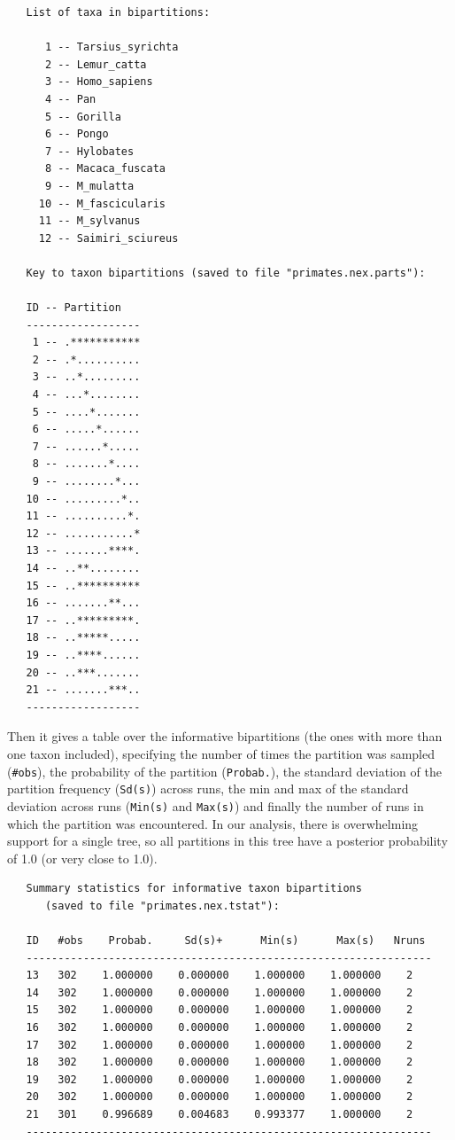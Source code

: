 \documentclass[12pt]{book}
\begin{document}
\begin{singlespacing}
\small
\begin{verbatim}
   List of taxa in bipartitions:                                                 
                                                                                   
      1 -- Tarsius_syrichta
      2 -- Lemur_catta
      3 -- Homo_sapiens
      4 -- Pan
      5 -- Gorilla
      6 -- Pongo
      7 -- Hylobates
      8 -- Macaca_fuscata
      9 -- M_mulatta
     10 -- M_fascicularis
     11 -- M_sylvanus
     12 -- Saimiri_sciureus

   Key to taxon bipartitions (saved to file "primates.nex.parts"):

   ID -- Partition
   ------------------
    1 -- .***********
    2 -- .*..........
    3 -- ..*.........
    4 -- ...*........
    5 -- ....*.......
    6 -- .....*......
    7 -- ......*.....
    8 -- .......*....
    9 -- ........*...
   10 -- .........*..
   11 -- ..........*.
   12 -- ...........*
   13 -- .......****.
   14 -- ..**........
   15 -- ..**********
   16 -- .......**...
   17 -- ..*********.
   18 -- ..*****.....
   19 -- ..****......
   20 -- ..***.......
   21 -- .......***..
   ------------------
\end{verbatim}
\normalsize
\end{singlespacing}

Then it gives a table over the informative bipartitions (the ones with more than one taxon
included), specifying the number of times the partition was sampled (\texttt{\#obs}), the
probability of the partition (\texttt{Probab.}), the standard deviation of the partition frequency
(\texttt{Sd(s)}) across runs, the min and max of the standard deviation across runs
(\texttt{Min(s)} and \texttt{Max(s)}) and finally the number of runs in which the partition was
encountered. In our analysis, there is overwhelming support for a single tree, so all partitions in
this tree have a posterior probability of 1.0 (or very close to 1.0).

\begin{singlespacing}
\small
\begin{verbatim}
   Summary statistics for informative taxon bipartitions
      (saved to file "primates.nex.tstat"):

   ID   #obs    Probab.     Sd(s)+      Min(s)      Max(s)   Nruns 
   ----------------------------------------------------------------
   13   302    1.000000    0.000000    1.000000    1.000000    2
   14   302    1.000000    0.000000    1.000000    1.000000    2
   15   302    1.000000    0.000000    1.000000    1.000000    2
   16   302    1.000000    0.000000    1.000000    1.000000    2
   17   302    1.000000    0.000000    1.000000    1.000000    2
   18   302    1.000000    0.000000    1.000000    1.000000    2
   19   302    1.000000    0.000000    1.000000    1.000000    2
   20   302    1.000000    0.000000    1.000000    1.000000    2
   21   301    0.996689    0.004683    0.993377    1.000000    2
   ----------------------------------------------------------------
\end{verbatim}
\normalsize
\end{singlespacing}
\end{document}
